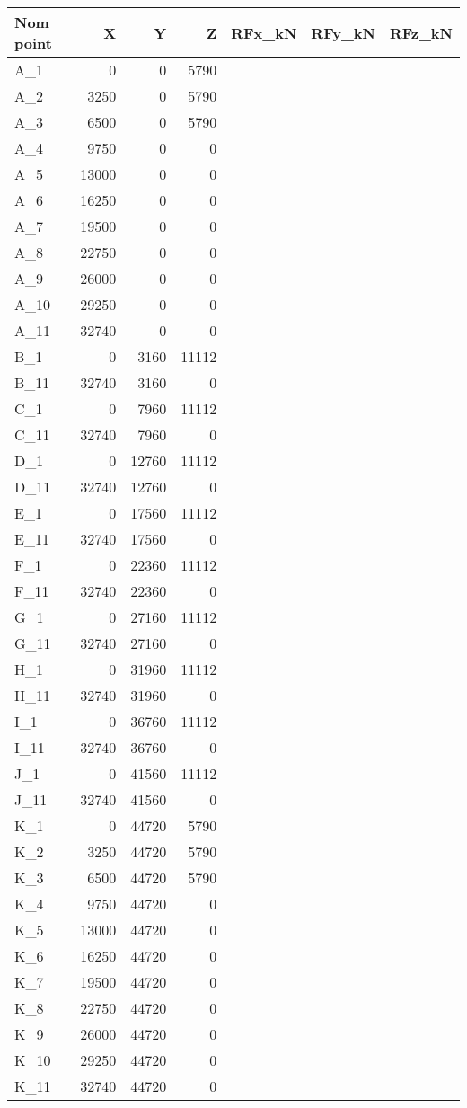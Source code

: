 \begin{tabular}{lrrrlll}
\toprule
Nom point & X & Y & Z & RFx\_kN & RFy\_kN & RFz\_kN \\
\midrule
A\_1 & 0 & 0 & 5790 &  &  &  \\
A\_2 & 3250 & 0 & 5790 &  &  &  \\
A\_3 & 6500 & 0 & 5790 &  &  &  \\
A\_4 & 9750 & 0 & 0 &  &  &  \\
A\_5 & 13000 & 0 & 0 &  &  &  \\
A\_6 & 16250 & 0 & 0 &  &  &  \\
A\_7 & 19500 & 0 & 0 &  &  &  \\
A\_8 & 22750 & 0 & 0 &  &  &  \\
A\_9 & 26000 & 0 & 0 &  &  &  \\
A\_10 & 29250 & 0 & 0 &  &  &  \\
A\_11 & 32740 & 0 & 0 &  &  &  \\
B\_1 & 0 & 3160 & 11112 &  &  &  \\
B\_11 & 32740 & 3160 & 0 &  &  &  \\
C\_1 & 0 & 7960 & 11112 &  &  &  \\
C\_11 & 32740 & 7960 & 0 &  &  &  \\
D\_1 & 0 & 12760 & 11112 &  &  &  \\
D\_11 & 32740 & 12760 & 0 &  &  &  \\
E\_1 & 0 & 17560 & 11112 &  &  &  \\
E\_11 & 32740 & 17560 & 0 &  &  &  \\
F\_1 & 0 & 22360 & 11112 &  &  &  \\
F\_11 & 32740 & 22360 & 0 &  &  &  \\
G\_1 & 0 & 27160 & 11112 &  &  &  \\
G\_11 & 32740 & 27160 & 0 &  &  &  \\
H\_1 & 0 & 31960 & 11112 &  &  &  \\
H\_11 & 32740 & 31960 & 0 &  &  &  \\
I\_1 & 0 & 36760 & 11112 &  &  &  \\
I\_11 & 32740 & 36760 & 0 &  &  &  \\
J\_1 & 0 & 41560 & 11112 &  &  &  \\
J\_11 & 32740 & 41560 & 0 &  &  &  \\
K\_1 & 0 & 44720 & 5790 &  &  &  \\
K\_2 & 3250 & 44720 & 5790 &  &  &  \\
K\_3 & 6500 & 44720 & 5790 &  &  &  \\
K\_4 & 9750 & 44720 & 0 &  &  &  \\
K\_5 & 13000 & 44720 & 0 &  &  &  \\
K\_6 & 16250 & 44720 & 0 &  &  &  \\
K\_7 & 19500 & 44720 & 0 &  &  &  \\
K\_8 & 22750 & 44720 & 0 &  &  &  \\
K\_9 & 26000 & 44720 & 0 &  &  &  \\
K\_10 & 29250 & 44720 & 0 &  &  &  \\
K\_11 & 32740 & 44720 & 0 &  &  &  \\
\bottomrule
\end{tabular}

